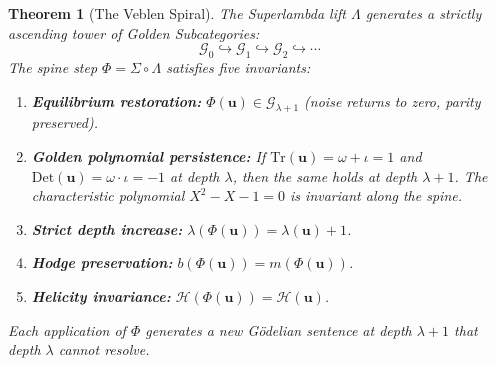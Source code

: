 \documentclass[12pt,oneside]{article}
\theoremstyle{principia}
\newtheorem{theorem}{Theorem}[section]
\theoremstyle{definition}
\theoremstyle{remark}
\providecommand{\GG}{\mathcal{G}}
\providecommand{\lam}{\lambda}
\begin{document}
\begin{theorem}[The Veblen Spiral]\label{thm:spiral}
The Superlambda lift $\Lambda$ generates a strictly ascending tower of Golden Subcategories:
$$\GG_0 \hookrightarrow \GG_1 \hookrightarrow \GG_2 \hookrightarrow \cdots$$
The spine step $\Phi = \Sigma \circ \Lambda$ satisfies five invariants:
\begin{enumerate}
\item \textbf{Equilibrium restoration:} $\Phi(\mathbf{u}) \in \GG_{\lam+1}$ (noise returns to zero, parity preserved).
\item \textbf{Golden polynomial persistence:} If $\mathrm{Tr}(\mathbf{u}) = \omega + \iota = 1$ and $\mathrm{Det}(\mathbf{u}) = \omega \cdot \iota = -1$ at depth $\lam$, then the same holds at depth $\lam + 1$. The characteristic polynomial $X^2 - X - 1 = 0$ is invariant along the spine.
\item \textbf{Strict depth increase:} $\lam(\Phi(\mathbf{u})) = \lam(\mathbf{u}) + 1$.
\item \textbf{Hodge preservation:} $b(\Phi(\mathbf{u})) = m(\Phi(\mathbf{u}))$.
\item \textbf{Helicity invariance:} $\mathcal{H}(\Phi(\mathbf{u})) = \mathcal{H}(\mathbf{u})$.
\end{enumerate}
Each application of $\Phi$ generates a new G\"odelian sentence at depth $\lam + 1$ that depth $\lam$ cannot resolve.
\end{theorem}
\end{document}
